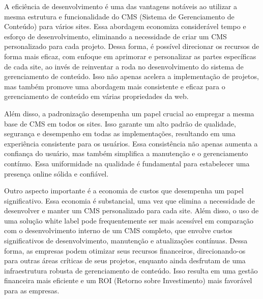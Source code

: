 \documentclass[12pt,twoside,english,brazilian]{article}
\begin{document}
A eficiência de desenvolvimento é uma das vantagens notáveis ao utilizar a mesma estrutura e funcionalidade do CMS (Sistema de Gerenciamento de Conteúdo) para vários sites. Essa abordagem economiza considerável tempo e esforço de desenvolvimento, eliminando a necessidade de criar um CMS personalizado para cada projeto. Dessa forma, é possível direcionar os recursos de forma mais eficaz, com enfoque em aprimorar e personalizar as partes específicas de cada site, ao invés de reinventar a roda no desenvolvimento do sistema de gerenciamento de conteúdo. Isso não apenas acelera a implementação de projetos, mas também promove uma abordagem mais consistente e eficaz para o gerenciamento de conteúdo em várias propriedades da web.

Além disso, a padronização desempenha um papel crucial ao empregar a mesma base de CMS em todos os sites. Isso garante um alto padrão de qualidade, segurança e desempenho em todas as implementações, resultando em uma experiência consistente para os usuários. Essa consistência não apenas aumenta a confiança do usuário, mas também simplifica a manutenção e o gerenciamento contínuo. Essa uniformidade na qualidade é fundamental para estabelecer uma presença online sólida e confiável.

Outro aspecto importante é a economia de custos que desempenha um papel significativo. Essa economia é substancial, uma vez que elimina a necessidade de desenvolver e manter um CMS personalizado para cada site. Além disso, o uso de uma solução white label pode frequentemente ser mais acessível em comparação com o desenvolvimento interno de um CMS completo, que envolve custos significativos de desenvolvimento, manutenção e atualizações contínuas. Dessa forma, as empresas podem otimizar seus recursos financeiros, direcionando-os para outras áreas críticas de seus projetos, enquanto ainda desfrutam de uma infraestrutura robusta de gerenciamento de conteúdo. Isso resulta em uma gestão financeira mais eficiente e um ROI (Retorno sobre Investimento) mais favorável para as empresas.
\end{document}
